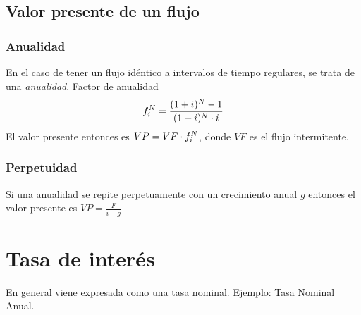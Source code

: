 \documentclass[twocolumn,10pt]{article}
\begin{document}
\subsection{Valor presente de un flujo}



\subsubsection{Anualidad}

En el caso de tener un flujo idéntico a intervalos de tiempo regulares, se trata de una \textit{anualidad}. Factor de anualidad
\[
f_i^N = \frac{(1+i)^N-1}{(1+i)^N\cdot i}
\]
El valor presente entonces es \( VP = VF \cdot f_i^N\), donde $VF$ es el flujo intermitente.

\subsubsection{Perpetuidad}
Si una anualidad se repite perpetuamente con un crecimiento anual $g$ entonces el valor presente es $VP = \frac{F}{i-g}$



\section{Tasa de interés}
En general viene expresada como una tasa nominal. Ejemplo: Tasa Nominal Anual.
\end{document}

